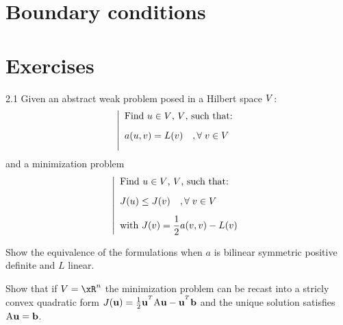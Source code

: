 \section{Boundary conditions}

\newpage

\section{Exercises}

\begin{tmaxrcs}{}{2.1}
Given an abstract weak problem posed in a Hilbert space ${V}$:
\begin{equation*}
\left\lvert
\begin{array}{ll}
\mbox{Find $u \in {V}$, ${V}$, such that:}\\[2ex]
a( u, v ) = L(v)\quad,{\forall\;}  v \in {V}\\[2ex]
\end{array}
\right .
\end{equation*}
and a minimization problem
\begin{equation*}
\left\lvert
\begin{array}{ll}
\mbox{Find $u \in {V}$, ${V}$, such that:}\\[2ex]
J(u) \leq J(v)\quad,{\forall\;}  v \in {V}\\[2ex]
\mbox{with $J(v) = \displaystyle\frac{1}{2} a(v,v) - L(v)$}
\end{array}
\right .
\end{equation*}
\begin{tmatsks}
\item Show the equivalence of the formulations when $a$ is bilinear symmetric positive definite and $L$ linear.
\item Show that if $\xV = \xR^n$ the minimization problem can be recast into a stricly convex quadratic form $J(\vecu) = \frac{1}{2} \vecu^\trans \matA \vecu - \vecu^\trans \vecb$ and the unique solution satisfies ${\mathrm A} \mathbf u = \mathbf b$.
\end{tmatsks}
\end{tmaxrcs}


